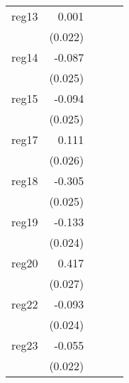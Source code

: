 {\begin{longtable}{l*{4}{D{.}{.}{-1}}}
\addlinespace
reg13       &       0.001         &                     &                     &                     \\
            &     (0.022)         &                     &                     &                     \\
\addlinespace
reg14       &      -0.087\sym{***}&                     &                     &                     \\
            &     (0.025)         &                     &                     &                     \\
\addlinespace
reg15       &      -0.094\sym{***}&                     &                     &                     \\
            &     (0.025)         &                     &                     &                     \\
\addlinespace
reg17       &       0.111\sym{***}&                     &                     &                     \\
            &     (0.026)         &                     &                     &                     \\
\addlinespace
reg18       &      -0.305\sym{***}&                     &                     &                     \\
            &     (0.025)         &                     &                     &                     \\
\addlinespace
reg19       &      -0.133\sym{***}&                     &                     &                     \\
            &     (0.024)         &                     &                     &                     \\
\addlinespace
reg20       &       0.417\sym{***}&                     &                     &                     \\
            &     (0.027)         &                     &                     &                     \\
\addlinespace
reg22       &      -0.093\sym{***}&                     &                     &                     \\
            &     (0.024)         &                     &                     &                     \\
\addlinespace
reg23       &      -0.055\sym{*}  &                     &                     &                     \\
            &     (0.022)         &                     &                     &                     \\

\end{longtable}}
